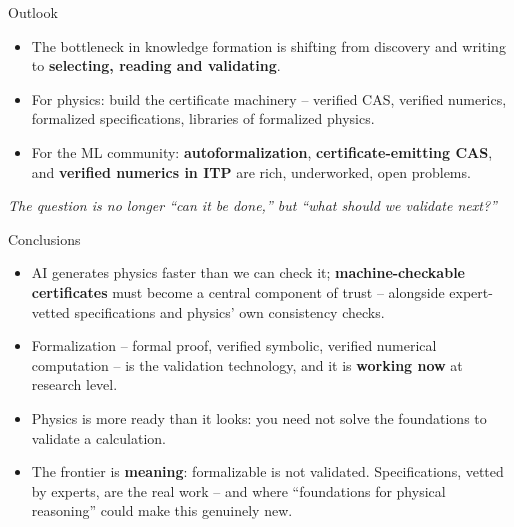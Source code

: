 \documentclass[aspectratio=169,xcolor=dvipsnames]{beamer}
\begin{document}
\begin{frame}{Outlook}
\begin{itemize}
  \item The bottleneck in knowledge formation is shifting from discovery and writing to
        \textbf{selecting, reading and validating}.
  \item For physics: build the certificate machinery -- verified CAS, verified numerics,
        formalized specifications, libraries of formalized physics.
  \item For the ML community: \textbf{autoformalization}, \textbf{certificate-emitting CAS}, and
        \textbf{verified numerics in ITP} are rich, underworked, open problems.
\end{itemize} \pause
\bigskip
\begin{center}
\emph{The question is no longer ``can it be done,'' but ``what should we validate next?''}
\end{center}
\end{frame}

\begin{frame}{Conclusions}
\begin{itemize}
  \item AI generates physics faster than we can check it; \textbf{machine-checkable
        certificates} must become a central component of trust -- alongside expert-vetted
        specifications and physics' own consistency checks.
  \item Formalization -- formal proof, verified symbolic, verified numerical computation --
        is the validation technology, and it is \textbf{working now} at research level.
  \item Physics is more ready than it looks: you need not solve the foundations to validate
        a calculation.
  \item The frontier is \textbf{meaning}: formalizable is not validated.  Specifications,
        vetted by experts, are the real work -- and where ``foundations for physical reasoning''
        could make this genuinely new.
\end{itemize}
\end{frame}
\end{document}
